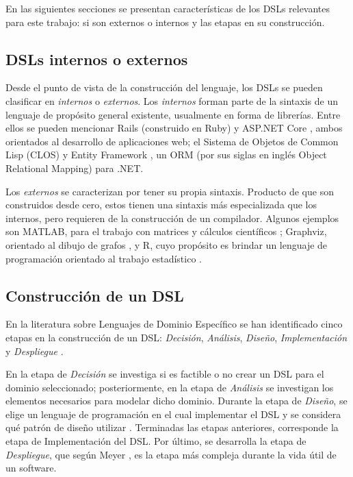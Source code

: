 En las siguientes secciones se presentan características de los DSLs relevantes para este trabajo: si son externos o internos y las etapas en su construcción.

\subsection{DSLs internos o externos}
Desde el punto de vista de la construcción del lenguaje, los DSLs se pueden clasificar en \textit{internos} o \textit{externos}. Los \textit{internos} forman parte de la sintaxis de un lenguaje de propósito general existente, usualmente en forma de librerías. Entre ellos se pueden mencionar Rails (construido en Ruby) \cite{ruby} y {ASP.NET Core} \cite{asp.netcore}, ambos orientados al desarrollo de aplicaciones web; el Sistema de Objetos de Common Lisp (CLOS) \cite{sonya} y Entity Framework \cite{entity}, un ORM (por sus siglas en inglés Object Relational Mapping) para .NET.
 
Los \textit{externos} se caracterizan por tener su propia sintaxis. Producto de que son construidos desde cero, estos tienen una sintaxis más especializada que los internos, pero requieren de la construcción de un compilador. Algunos ejemplos son {MATLAB}, para el trabajo con matrices y cálculos científicos \cite{matlab}; Graphviz, orientado al dibujo de grafos \cite{graph}, y R, cuyo propósito es brindar un lenguaje de programación orientado al trabajo estadístico \cite{R}.

\subsection{Construcción de un DSL}

En la literatura sobre Lenguajes de Dominio Específico se han identificado cinco etapas en la construcción de un DSL: \textit{Decisión}, \textit{Análisis}, \textit{Diseño}, \textit{Implementación} y \textit{Despliegue} \cite{dslEngineering} \cite{implementations_DSL} \cite{dsl1}.

En la etapa de \textit{Decisión} se investiga si es factible o no crear un DSL para el dominio seleccionado; posteriormente, en la etapa de \textit{Análisis} se investigan los elementos necesarios para modelar dicho dominio. Durante la etapa de \textit{Diseño}, se elige un lenguaje de programación en el cual implementar el DSL y se considera qué patrón de diseño utilizar \cite{dslEngineering}. Terminadas las etapas anteriores, corresponde la etapa de Implementación del DSL. Por último, se desarrolla la etapa de \textit{Despliegue}, que según Meyer \cite{meyer}, es la etapa más compleja durante la vida útil de un software.

